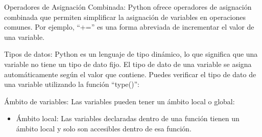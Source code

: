 Operadores de Asignación Combinada: Python ofrece operadores de asignación combinada que permiten simplificar la asignación de variables en operaciones comunes. Por ejemplo, ``+='' es una forma abreviada de incrementar el valor de una variable.\\

\begin{figure}[h]
    \centering
  \end{figure}

Tipos de datos: Python es un lenguaje de tipo dinámico, lo que significa que una variable no tiene un tipo de dato fijo. El tipo de dato de una variable se asigna automáticamente según el valor que contiene. Puedes verificar el tipo de dato de una variable utilizando la función ``type()'':\newpage

\begin{figure}[h]
    \centering
  \end{figure}

Ámbito de variables: Las variables pueden tener un ámbito local o global:

\begin{itemize}
    \item Ámbito local: Las variables declaradas dentro de una función tienen un ámbito local y solo son accesibles dentro de esa función.
\end{itemize}

